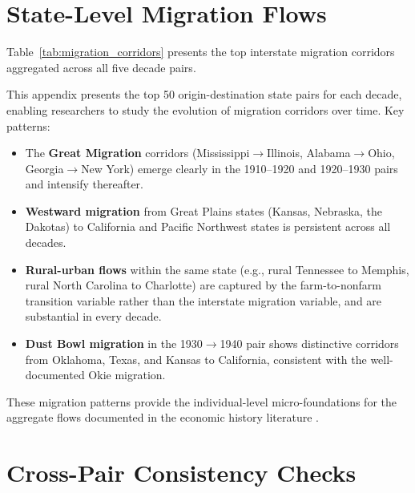 \documentclass[12pt]{article}
\begin{document}
\section{State-Level Migration Flows}\label{app:migration}

Table~\ref{tab:migration_corridors} presents the top interstate migration corridors aggregated across all five decade pairs.



This appendix presents the top 50 origin-destination state pairs for each decade, enabling researchers to study the evolution of migration corridors over time. Key patterns:

\begin{itemize}
\item The \textbf{Great Migration} corridors (Mississippi$\rightarrow$Illinois, Alabama$\rightarrow$Ohio, Georgia$\rightarrow$New York) emerge clearly in the 1910--1920 and 1920--1930 pairs and intensify thereafter.

\item \textbf{Westward migration} from Great Plains states (Kansas, Nebraska, the Dakotas) to California and Pacific Northwest states is persistent across all decades.

\item \textbf{Rural-urban flows} within the same state (e.g., rural Tennessee to Memphis, rural North Carolina to Charlotte) are captured by the farm-to-nonfarm transition variable rather than the interstate migration variable, and are substantial in every decade.

\item \textbf{Dust Bowl migration} in the 1930$\rightarrow$1940 pair shows distinctive corridors from Oklahoma, Texas, and Kansas to California, consistent with the well-documented Okie migration.
\end{itemize}

These migration patterns provide the individual-level micro-foundations for the aggregate flows documented in the economic history literature \citep{boustan2010, collins2000, hornbeck2010}.


\section{Cross-Pair Consistency Checks}\label{app:consistency}
\end{document}
